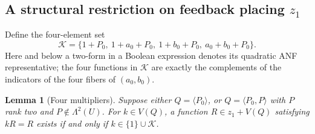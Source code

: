 \documentclass[11pt,a4paper]{article}
\theoremstyle{plain}
\newtheorem{lemma}[theorem]{Lemma}
\theoremstyle{remark}
\begin{document}
\subsection[A structural restriction on feedback placing z1]{A structural restriction on feedback placing $z_1$}
Define the four-element set
\[
\mathcal K=\{1+P_0,\ 1+a_0+P_0,\ 1+b_0+P_0,\ a_0+b_0+P_0\}.
\]
Here and below a two-form in a Boolean expression denotes its quadratic ANF representative; the four functions in $\mathcal K$ are exactly the complements of the indicators of the four fibers of $(a_0,b_0)$.

\begin{lemma}[Four multipliers]\label{l2:lem:four}
Suppose either $Q=\langle P_0\rangle$, or $Q=\langle P_0,P\rangle$ with $P$ rank two and $P\notin\Lambda^2(U)$. For $k\in V(Q)$, a function $R\in z_1+V(Q)$ satisfying $kR=R$ exists if and only if $k\in\{1\}\cup\mathcal K$.
\end{lemma}
\end{document}
